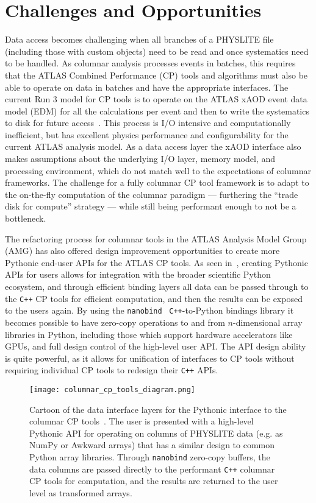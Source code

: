 \section{Challenges and Opportunities}\label{sec:challenges}

Data access becomes challenging when all branches of a PHYSLITE file (including those with custom objects) need to be read and once systematics need to be handled.
As columnar analysis processes events in batches, this requires that the ATLAS Combined Performance (CP) tools and algorithms must also be able to operate on data in batches and have the appropriate interfaces.
The current Run 3 model for CP tools is to operate on the ATLAS xAOD event data model (EDM) for all the calculations per event and then to write the systematics to disk for future access~\cite{SOFT-2022-02}.
This process is I/O intensive and computationally inefficient, but has excellent physics performance and configurability for the current ATLAS analysis model.
As a data access layer the xAOD interface also makes assumptions about the underlying I/O layer, memory model, and processing environment, which do not match well to the expectations of columnar frameworks.
The challenge for a fully columnar CP tool framework is to adapt to the on-the-fly computation of the columnar paradigm --- furthering the ``trade disk for compute'' strategy --- while still being performant enough to not be a bottleneck.

The refactoring process for columnar tools in the ATLAS Analysis Model Group (AMG) has also offered design improvement opportunities to create more Pythonic end-user APIs for the ATLAS CP tools.
As seen in~, creating Pythonic APIs for users allows for integration with the broader scientific Python ecosystem, and through efficient binding layers all data can be passed through to the \texttt{C++} CP tools for efficient computation, and then the results can be exposed to the users again.
By using the \texttt{nanobind}~\cite{nanobind} \texttt{C++}-to-Python bindings library it becomes possible to have zero-copy operations to and from $n$-dimensional array libraries in Python, including those which support hardware accelerators like GPUs, and full design control of the high-level user API.
The API design ability is quite powerful, as it allows for unification of interfaces to CP tools without requiring individual CP tools to redesign their \texttt{C++} APIs.

\begin{figure}
    \centering
    \texttt{[image: columnar\_cp\_tools\_diagram.png]}
    \caption{Cartoon of the data interface layers for the Pythonic interface to the columnar CP tools~\cite{Vigl:ACAT_2024}.
The user is presented with a high-level Pythonic API for operating on columns of PHYSLITE data (e.g. as NumPy or Awkward arrays) that has a similar design to common Python array libraries.
Through \texttt{nanobind} zero-copy buffers, the data columns are passed directly to the performant \texttt{C++} columnar CP tools for computation, and the results are returned to the user level as transformed arrays.}
    \label{fig:columnar_cp_tools_diagram}
\end{figure}
